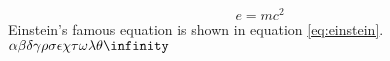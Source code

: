 \documentclass{article}
\begin{document}
\begin{equation}
e=mc^2
\label{eq:einstein}
\end{equation}
Einstein's famous equation is shown in equation \ref{eq:einstein}.
$\alpha
\beta
\delta
\gamma
\rho
\sigma
\epsilon
\chi
\tau
\omega
\lambda
\theta
\infinity$
\end{document}
